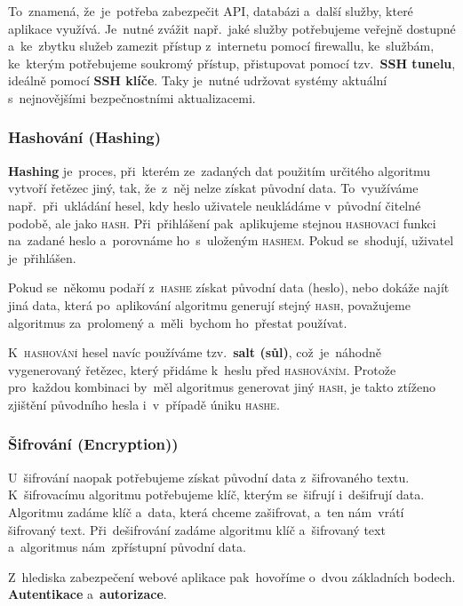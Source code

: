 \documentclass[14pt,a4paper]{article}
\begin{document}
        To~znamená, že~je~potřeba zabezpečit \textsc{API}, databázi a~další služby, které aplikace využívá. Je~nutné zvážit např.~jaké služby potřebujeme veřejně dostupné a~ke~zbytku služeb zamezit přístup z~internetu pomocí firewallu, ke~službám, ke~kterým potřebujeme soukromý přístup, přistupovat pomocí tzv.~\textbf{SSH tunelu}, ideálně pomocí \textbf{SSH klíče}. Taky je~nutné udržovat systémy aktuální s~nejnovějšími bezpečnostními aktualizacemi.
            
        \subsubsection{Hashování (Hashing)}
        \textbf{Hashing} je~proces, při~kterém ze~zadaných dat použitím určitého algoritmu vytvoří řetězec jiný, tak, že~z~něj nelze získat původní data. To~využíváme např.~při~ukládání hesel, kdy heslo uživatele neukládáme v~původní čitelné podobě, ale jako \textsc{hash}. Při~přihlášení pak~aplikujeme stejnou \textsc{hashovací} funkci na~zadané heslo a~porovnáme ho~s~uloženým \textsc{hashem}. Pokud se~shodují, uživatel je~přihlášen.
        
        Pokud se~někomu podaří z~\textsc{hashe} získat původní data (heslo), nebo dokáže najít jiná data, která po~aplikování algoritmu generují stejný \textsc{hash}, považujeme algoritmus za~prolomený a~měli~bychom ho~přestat používat.
        
        K~\textsc{hashování} hesel navíc používáme tzv.~\textbf{salt (sůl)}, což~je~náhodně vygenerovaný řetězec, který přidáme k~heslu před \textsc{hashováním}. Protože pro~každou kombinaci by~měl algoritmus generovat jiný \textsc{hash}, je takto ztíženo zjištění původního hesla i~v~případě úniku \textsc{hashe}.
        
        \subsubsection{Šifrování (Encryption))}
        U~šifrování naopak potřebujeme získat původní data z~šifrovaného textu. K~šifrovacímu algoritmu potřebujeme klíč, kterým se~šifrují i~dešifrují data. Algoritmu zadáme klíč a~data, která chceme zašifrovat, a~ten nám~vrátí šifrovaný text. Při~dešifrování zadáme algoritmu klíč a~šifrovaný text a~algoritmus nám~zpřístupní původní data.

        Z~hlediska zabezpečení webové aplikace pak~hovoříme o~dvou základních bodech. \textbf{Autentikace} a~\textbf{autorizace}.
\end{document}
